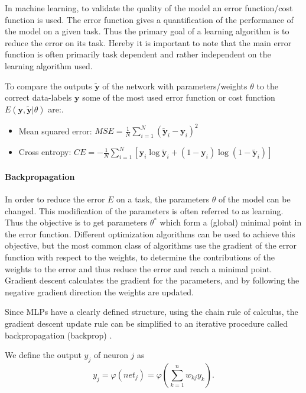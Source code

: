 In machine learning, to validate the quality of the model an error function/cost function is used.
The error function gives a quantification of the performance of the model on a given task.
Thus the primary goal of a learning algorithm is to reduce the error on its task.
Hereby it is important to note that the main error function is often primarily task dependent and rather independent on the learning algorithm used.  

To compare the outputs $\tilde{\textbf{y}}$ of the network with parameters/weights $\theta$ to the correct data-labels $\textbf{y}$ some of the most used error function or cost function $E(\textbf{y},\tilde{\textbf{y}} | \theta)$ are:.

\begin{itemize}
	\item Mean squared error: $MSE = \frac{1}{N} \sum_{i=1}^N (\tilde{\textbf{y}}_i - \textbf{y}_i)^2 $
	\item Cross entropy: $CE = - \frac{1}{N} \sum_{i=1}^N [ \textbf{y}_i \log \tilde{\textbf{y}}_i + (1 - \textbf{y}_i) \log (1 - \tilde{\textbf{y}}_i)]$
\end{itemize}

\paragraph{Backpropagation}

In order to reduce the error $E$ on a task, the parameters $\theta$ of the model can be changed.
This modification of the parameters is often referred to as learning.
Thus the objective is to get parameters $\theta^*$ which form a (global) minimal point in the error function. 
Different optimization algorithms can be used to achieve this objective, but the most common class of algorithms use the gradient of the error function with respect to the weights, to determine the contributions of the weights to the error and thus reduce the error and reach a minimal point.
Gradient descent calculates the gradient for the parameters, and by following the negative gradient direction the weights are updated.

Since MLPs have a clearly defined structure, using the chain rule of calculus, the gradient descent update rule can be simplified to an iterative procedure called backpropagation (backprop)  \cite{rumelhart1985learning}\cite{Goodfellow-et-al-2016-Book}.

We define the output $y_j$ of neuron $j$ as
\[
	y_j = \varphi(net_j) = \varphi(\sum_{k=1}^n w_{kj} y_k) .
\]
 
